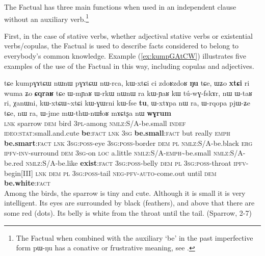 \documentclass[oldfontcommands,oneside,a4paper,11pt]{article}
\newcommand{\ipa}[1]{{\phon \mbox{#1}}} %
\newcommand{\refb}[1]{(\ref{#1})}
\newcommand{\factual}[1]{\textsc{:fact}}
\newcommand{\rdp}{\textasciitilde{}}
\begin{document}
The Factual has three main functions when used in an independent clause without an auxiliary verb.\footnote{The Factual when combined with the auxiliary  `be' in the past imperfective form \ipa{pɯ-ŋu} has a conative or frustrative meaning, see \citealt[292]{jacques14linking}.}

First,  in the case of stative verbs, whether adjectival stative verbs or existential verbs/copulas, the Factual is used to describe facts considered to belong to everybody's common knowledge. Example \refb{ex:kumpGAtCW} illustrates five examples of the use of the Factual in this way, including copulas and adjectives. 

\begin{exe}
\ex \label{ex:kumpGAtCW}
\gll
\ipa{tɕe} 	\ipa{kumpɣɤtɕɯ} 	\ipa{nɯnɯ} 	\ipa{pɣɤtɕɯ} 	\ipa{nɯ-rca,} 
 \ipa{kɯ-xtɕi} 	\ipa{ci} 	\ipa{zdoʁzdoʁ} 	\ipa{\textbf{ŋu}} 	\ipa{tɕe,}  \ipa{ɯʑo} 	\ipa{\textbf{xtɕi}} 	\ipa{ri} 	\ipa{wuma} 	\ipa{ʑo} 	\ipa{\textbf{ɕqraʁ}} \ipa{tɕe}  	\ipa{ɯ-mɲaʁ} 	\ipa{ɯ-rkɯ} 	\ipa{nɯnɯ} 	\ipa{ra} \ipa{kɯ-ɲaʁ} 	\ipa{kɯ} 	\ipa{tú-wɣ-fskɤr,} 	 	\ipa{nɯ} 	\ipa{ɯ-taʁ} 	\ipa{ri,} 	\ipa{χanɯni,} 	\ipa{kɯ-xtɕɯ\rdp{}xtɕi} 	\ipa{kɯ-ɣɯrni} 	\ipa{kɯ-fse} 	\ipa{\textbf{tu},}  	\ipa{ɯ-xtɤpa} 	\ipa{nɯ} \ipa{ra,} 	\ipa{ɯ-rqopa} 	\ipa{pjɯ-ʑe} 	\ipa{tɕe,} 	\ipa{nɯ} \ipa{ra,}  \ipa{ɯ-jme} 	\ipa{mɯ-thɯ-nɯɬoʁ} 	\ipa{mɤɕtʂa} 	\ipa{nɯ} 	\ipa{\textbf{wɣrum}} \\
\textsc{lnk} sparrow \textsc{dem} bird \textsc{3pl}-among \textsc{nmlz}:S/A-be.small \textsc{indef} \textsc{ideo:stat}:small.and.cute \textbf{be}\factual{} \textsc{lnk}  \textsc{3sg} \textbf{be.small}\factual{} but really \textsc{emph} \textbf{be.smart}\factual{}  \textsc{lnk}  \textsc{3sg:poss}-eye \textsc{3sg:poss}-border \textsc{dem}  \textsc{pl}  \textsc{nmlz}:S/A-be.black \textsc{erg} \textsc{ipfv-inv}-surround \textsc{dem} \textsc{3sg}-on \textsc{loc} a.little \textsc{nmlz}:S/A-\textsc{emph}\rdp{}be.small \textsc{nmlz}:S/A-be.red \textsc{nmlz}:S/A-be.like \textbf{exist}\factual{} \textsc{3sg:poss}-belly \textsc{dem}  \textsc{pl}  \textsc{3sg:poss}-throat \textsc{ipfv}-begin[III] \textsc{lnk}   \textsc{dem}  \textsc{pl}  \textsc{3sg:poss}-tail \textsc{neg-pfv-auto}-come.out until \textsc{dem} \textbf{be.white}\factual{} \\
\glt Among the birds, the sparrow is tiny and cute. Although it is small it is very intelligent. Its eyes are surrounded by black (feathers), and above that there are some red (dots). Its belly is white from the throat until the tail. (Sparrow, 2-7)
\end{exe}
\end{document}
